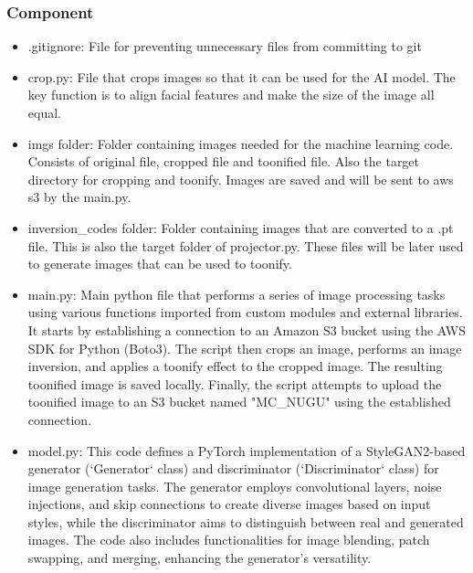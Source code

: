 \documentclass[conference]{IEEEtran}
\begin{document}
        \subsubsection{Component}
            \begin{itemize}
                \item .gitignore: File for preventing unnecessary files from committing to git\\
                \vspace{3mm}
                \item crop.py: File that crops images so that it can be used for the AI model. The key function is to align facial features and make the size of the image all equal.\\
                \vspace{3mm}
                \item imgs folder: Folder containing images needed for the machine learning code. Consists of original file, cropped file and toonified file. Also the target directory for cropping and toonify. Images are saved and will be sent to aws s3 by the main.py.\\
                \vspace{3mm}
                \item inversion\_codes folder: Folder containing images that are converted to a .pt file. This is also the target folder of projector.py. These files will be later used to generate images that can be used to toonify.\\
                \vspace{3mm}
                \item main.py: Main python file that performs a series of image processing tasks using various functions imported from custom modules and external libraries. It starts by establishing a connection to an Amazon S3 bucket using the AWS SDK for Python (Boto3). The script then crops an image, performs an image inversion, and applies a toonify effect to the cropped image. The resulting toonified image is saved locally. Finally, the script attempts to upload the toonified image to an S3 bucket named "MC\_NUGU" using the established connection.\\
                \vspace{3mm}
                \item model.py: This code defines a PyTorch implementation of a StyleGAN2-based generator (`Generator` class) and discriminator (`Discriminator` class) for image generation tasks. The generator employs convolutional layers, noise injections, and skip connections to create diverse images based on input styles, while the discriminator aims to distinguish between real and generated images. The code also includes functionalities for image blending, patch swapping, and merging, enhancing the generator's versatility.\\

\end{itemize}
\end{document}
